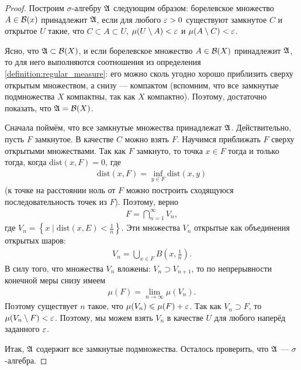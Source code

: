 \begin{proof}
 Построим $\sigma$-алгебру $\mathfrak{A}$ следующим образом: борелевское множество $A \in \mathcal{B}(x)$ принадлежит $\mathfrak{A}$, если для любого $\varepsilon > 0$ существуют замкнутое $C$ и открытое $U$ такие, что $C \subset A \subset U$, $\mu(U \setminus A) < \varepsilon$ и $\mu(A \setminus C) < \varepsilon$.

 Ясно, что $\mathfrak{A} \subset \mathcal{B}(X)$, и если борелевское множество $A \in \mathcal{B}(X)$ принадлежит $\mathfrak{A}$, то для него выполняются соотношения из определения \ref{definition:regular_measure}: его можно сколь угодно хорошо приблизить сверху открытым множеством, а снизу --- компактом (вспомним, что все замкнутые подмножества $X$ компактны, так как $X$ компактно). Поэтому, достаточно показать, что $\mathfrak{A} = \mathcal{B}(X)$.

 Сначала поймём, что все замкнутые множества принадлежат $\mathfrak{A}$. Действительно, пусть $F$ замкнутое. В качестве $C$ можно взять $F$. Научимся приближать $F$ сверху открытыми множествами. Так как $F$ замкнуто, то точка $x \in F$ тогда и только тогда, когда $\mathrm{dist}(x, F) = 0$, где  \begin{align*}
  \mathrm{dist}(x, F) = \inf_{y \in F} \mathrm{dist}(x,y)
 \end{align*} (к точке на расстоянии ноль от $F$ можно построить сходящуюся последовательность точек из $F$). Поэтому, верно
\begin{align*}
F = \bigcap_{n=1}^{\infty} V_n
,\end{align*}
где $V_n = \left\{ x \mid \mathrm{dist}(x, E) < \frac{1}{n} \right\}$. Эти множества $V_n$ открытые как объединения открытых шаров: \begin{align*}
 V_n = \bigcup_{x \in F} B \left( x, \frac{1}{n} \right)
.\end{align*}  В силу того, что множества $V_n$ вложены: $V_n \supset V_{n+1}$, то по непрерывности конечной меры снизу имеем
\begin{align*}
\mu(F) = \lim_{n \to \infty} \mu(V_n) 
.\end{align*} Поэтому существует $n$ такое, что $\mu(V_n) \leqslant \mu(F) + \varepsilon$. Так как $V_n \supset F$, то $\mu(V_n \setminus F) < \varepsilon$. Поэтому, мы можем взять $V_n$ в качестве $U$ для любого наперёд заданного $\varepsilon$.


 Итак, $\mathfrak{A}$ содержит все замкнутые подмножества. Осталось проверить, что $\mathfrak{A}$ --- $\sigma$-алгебра.


\end{proof}
